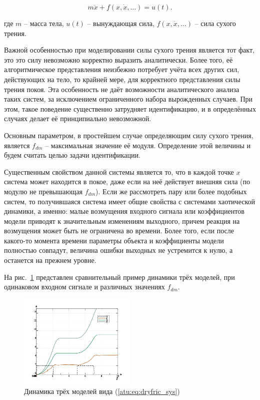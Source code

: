 \documentclass[a4paper,12pt]{article}
\begin{document}
\begin{equation}
 m \ddot{x} + f( x, \dot{x}, \ldots)  = u(t).
\label{atu:eq:dryfric_sys}
\end{equation}

\noindent
где
$m$ -- масса тела,
$u(t)$ -- вынуждающая сила,
$ f( x, \dot{x}, \ldots)  $ -- сила сухого трения.

Важной особенностью при моделировании силы сухого трения является тот факт,
это это силу невозможно корректно выразить аналитически. Более того,
её алгоритмическое представления неизбежно потребует учёта всех других сил,
действующих на тело, то крайней мере, для корректного представления
силы трения покоя. Эта особенность не даёт возможности
аналитического анализа таких систем, за исключением ограниченного набора
вырожденных случаев. При этом, такое поведение существенно затрудняет идентификацию,
и в определённых случаях делает её принципиально невозможной.

Основным параметром, в простейшем случае определяющим силу сухого
трения, является $f_{dm}$ -- максимальная значение её модуля.
Определение этой величины и будем считать целью задачи идентификации.

Существенным свойством данной системы является то, что в каждой точке \(x\)
система может находится в покое, даже если на неё действует
внешняя сила (по модулю не превышающая $f_{dm}$).
Если же рассмотреть пару или более подобных систем,
то получившаяся система имеет общие свойства с системами
хаотической динамики, а именно: малые возмущения входного сигнала
или коэффициентов модели приводят к значительным изменениям
выходного, причем реакция на возмущения может быть
не ограничена во времени.
Более того, если после какого-то момента времени
параметры объекта и коэффициенты модели полностью совпадут,
величина ошибки выходных не устремится к нулю, а останется на прежнем уровне.

На рис.~\ref{atu:f:fric_outs} представлен сравнительный пример динамики трёх
моделей, при одинаковом входном сигнале
и различных значениях $f_{dm}$.

\begin{figure}[htb!]
  \centerline{
    \includegraphics[width=0.5\textwidth]{p/cha/fric/fric_outs.png}
  }
  \caption{Динамика трёх моделей вида (\ref{atu:eq:dryfric_sys})}
  \label{atu:f:fric_outs}
\end{figure}
\end{document}
